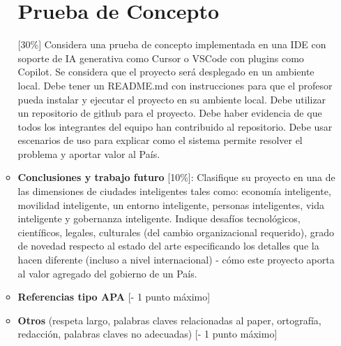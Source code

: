 \begin{itemize}
\begin{itemize}
        \section{Prueba de Concepto} [30\%]
        Considera una prueba de concepto implementada en una IDE con soporte de IA generativa como Cursor o VSCode con plugins como Copilot. Se considera que el proyecto será desplegado en un ambiente local. Debe tener un README.md con instrucciones para que el profesor pueda instalar y   ejecutar el proyecto en su ambiente local. Debe utilizar un repositorio de github para el proyecto. Debe haber evidencia de que todos los integrantes del equipo han contribuido al repositorio. Debe usar escenarios de uso para explicar como el sistema permite resolver el problema y aportar valor al País.         
        \item \textbf{Conclusiones y trabajo futuro} [10\%]:  Clasifique su proyecto en una de las dimensiones de ciudades inteligentes tales como: economía inteligente, movilidad inteligente, un entorno inteligente, personas inteligentes, vida inteligente y gobernanza inteligente. Indique desafíos tecnológicos, científicos, legales, culturales (del cambio organizacional requerido), grado de novedad respecto al estado del arte especificando los detalles que la hacen diferente (incluso a nivel internacional) - cómo este proyecto aporta al valor agregado del gobierno de un País. 
        \item \textbf{Referencias tipo APA} [- 1 punto máximo]
        \item  \textbf{Otros} (respeta largo, palabras claves relacionadas al paper, ortografía, redacción, palabras claves no adecuadas) [- 1 punto máximo]
        
    \end{itemize}
\end{itemize}
   

